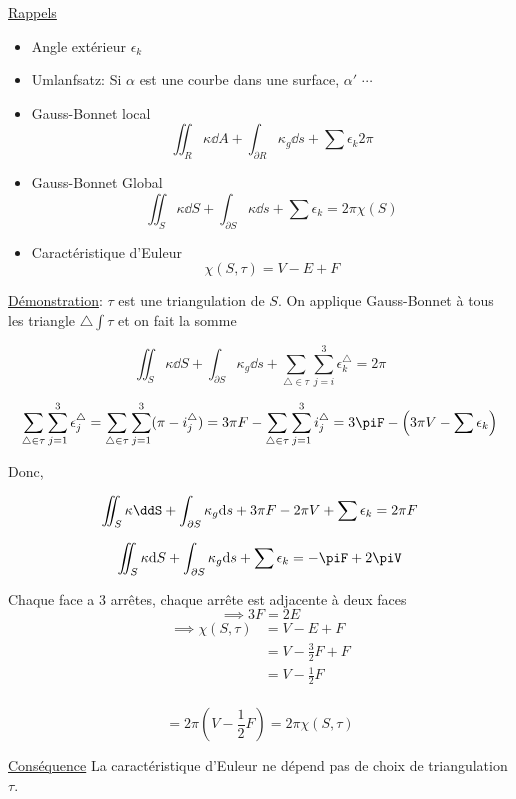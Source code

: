 



\underline{Rappels} 

\begin{itemize}
	\item Angle extérieur $\epsilon_k$
	\item Umlanfsatz: Si $\alpha$ est une courbe dans une surface, $\alpha'$ $\dotsb$   
	\item  Gauss-Bonnet local $$\iint_R \kappa \dd A + \int_{\partial R} \kappa_g \dd s + \sum\epsilon_k 2\pi $$ 
	\item Gauss-Bonnet Global $$\iint_S \kappa \dd S + \int_{\partial S} \kappa \dd s + \sum \epsilon_k = 2\pi \chi(S)$$ 
	\item Caractéristique d'Euleur $$\chi(S,\tau) = V -E +F$$ 
\end{itemize}

\underline{Démonstration}: $\tau$ est une triangulation de $S$. On applique Gauss-Bonnet à tous les triangle $\triangle\int\tau$ et on fait la somme    

$$\iint_S \kappa \dd S + \int_{\partial S} \kappa_g \dd s + \sum_{\triangle\in\tau} \sum_{j=i}^{3} \epsilon_k^\triangle  =2\pi   $$ 

$$\sum_{\triangle\in\tau} \sum_{j=1}^{3} \epsilon_j^\triangle  = \sum_{\triangle\in\tau} \sum_{j=1}^{3} (\pi - i_j^\triangle) = 3\pi F- \sum_{\triangle\in\tau} \sum_{j=1}^{3} i_j^\triangle = 3\piF -\left( 3\pi V - \sum \epsilon_k \right) $$ 

Donc,

$$\iint_S \kappa \ddS + \int_{\partial S} \kappa_g \dd s+ 3\pi F - 2\pi V + \sum \epsilon_k = 2\pi F $$ 

$$\iint_S \kappa \dd S + \int_{\partial S} \kappa_g \dd s + \sum \epsilon_k = -\piF + 2\piV$$ 
\begin{tcolorbox}[title=]
	Chaque face a 3 arrêtes, chaque arrête est adjacente à deux faces $$\implies 3F=2E$$ $$\begin{aligned}\implies \chi(S,\tau) &= V-E+F \\ &= V-\frac{3}{2} F +F \\ &= V- \frac{1}{2} F \\
	 \end{aligned}$$  
\end{tcolorbox}

$$= 2\pi(V - \frac{1}{2} F) = 2\pi\chi(S,\tau)$$ 

\underline{Conséquence} La caractéristique d'Euleur ne dépend pas de choix de triangulation $\tau$.

